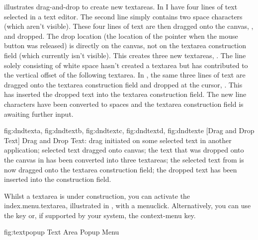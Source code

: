  illustrates \gls{drag-and-drop} to create new
\glspl{textarea}.
In  I have four lines of
text selected in a text editor. The second line simply contains two
space characters (which aren't visible). These four lines of text
are then dragged onto the \gls{canvas},
, and dropped. The drop location (the
location of the pointer when the mouse button was released) is
directly on the canvas, not on the \gls{textarea} construction field (which
currently isn't visible). This creates three new \glspl*{textarea},
.
The line solely consisting of white space hasn't created a 
\gls{textarea} but has contributed to the vertical offset of the following
\gls{textarea}. In , the same three lines of
text are dragged onto the \gls{textarea} construction field and dropped
at the cursor, . This has inserted the
dropped text into the \gls{textarea} construction field. The new line
characters have been converted to spaces and the \gls{textarea}
construction field is awaiting further input.

{
 {fig:dndtexta}{}{},
 {fig:dndtextb}{}{},
 {fig:dndtextc}{}{},
 {fig:dndtextd}{}{},
 {fig:dndtexte}{}{}
}
[Drag and Drop Text]
{Drag and Drop Text:  drag initiated on some
selected text in another application; 
selected text dragged onto canvas;  the text
that was dropped onto the canvas in  has
been converted into three \glspl{textarea}; 
the selected text from  is now dragged onto
the \gls{textarea} construction field;  the
dropped text has been inserted into the construction field.}


Whilst a \gls{textarea} is under construction, you can activate the
\gls{index.menu.textarea}, illustrated in
, with a \gls{menuclick}. Alternatively,
you can use the  key or, if supported by your
system, the  \gls{context-menu} key.

\FloatFig
  {fig:textpopup}
  {}
  {Text Area Popup Menu}


